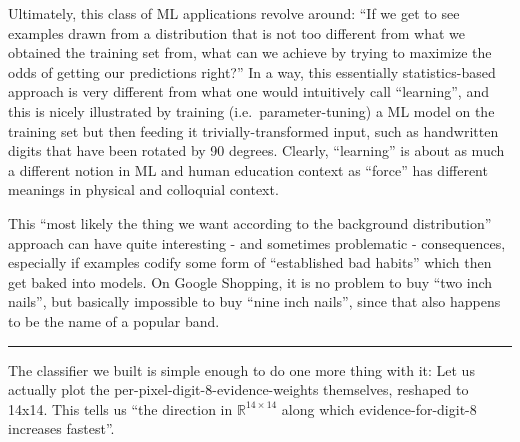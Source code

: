 \documentclass[11pt]{article}
\begin{document}
Ultimately, this class of ML applications revolve around: ``If we get to
see examples drawn from a distribution that is not too different from
what we obtained the training set from, what can we achieve by trying to
maximize the odds of getting our predictions right?'' In a way, this
essentially statistics-based approach is very different from what one
would intuitively call ``learning'', and this is nicely illustrated by
training (i.e.~parameter-tuning) a ML model on the training set but then
feeding it trivially-transformed input, such as handwritten digits that
have been rotated by 90 degrees. Clearly, ``learning'' is about as much
a different notion in ML and human education context as ``force'' has
different meanings in physical and colloquial context.

This ``most likely the thing we want according to the background
distribution'' approach can have quite interesting - and sometimes
problematic - consequences, especially if examples codify some form of
``established bad habits'' which then get baked into models. On Google
Shopping, it is no problem to buy ``two inch nails'', but basically
impossible to buy ``nine inch nails'', since that also happens to be the
name of a popular band.

\begin{center}\rule{0.5\linewidth}{0.5pt}\end{center}

The classifier we built is simple enough to do one more thing with it:
Let us actually plot the per-pixel-digit-8-evidence-weights themselves,
reshaped to 14x14. This tells us ``the direction in
\({\mathbb R}^{14\times 14}\) along which evidence-for-digit-8 increases
fastest''.
\end{document}
